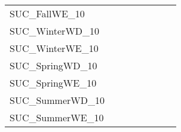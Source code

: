 \begin{table}[H]
{\begin{tabular}{|l|ll|ll|l|l|l|}
			SUC\_FallWE\_10                &                                 &                                &                                  &                                 &                                    &                            &                            \\
			SUC\_WinterWD\_10              &                                 &                                &                                  &                                 &                                    &                            &                            \\
			SUC\_WinterWE\_10              &                                 &                                &                                  &                                 &                                    &                            &                            \\
			SUC\_SpringWD\_10              &                                 &                                &                                  &                                 &                                    &                            &                            \\
			SUC\_SpringWE\_10              &                                 &                                &                                  &                                 &                                    &                            &                            \\
			SUC\_SummerWD\_10              &                                 &                                &                                  &                                 &                                    &                            &                            \\
			SUC\_SummerWE\_10              &                                 &                                &                                  &                                 &                                    &                            &                            \\ \hline
		\end{tabular}%
	}
\end{table}



